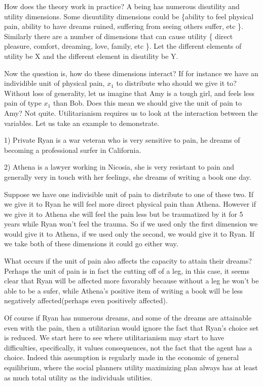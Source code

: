 \documentclass[12pt]{report}
\numberwithin{equation}{section}
\begin{document}
How does the theory work in practice? A being has numerous disutility and utility dimensions. Some disuutility dimensions could be \{ability to feel physical pain, ability to have dreams ruined, suffering from seeing others suffer, etc \}. Similarly there are a number of dimensions that can cause utility \{ direct pleasure, comfort, dreaming, love, family, etc \}. Let the different elements of utility be X and the different element in disutility be Y. 

Now the question is, how do these dimensions interact? If for instance we have an individible unit of physical pain, $x_1$ to distribute who should we give it to? Without loss of generality, let us imagine that Amy is a tough girl, and feels less pain of type $x_1$ than Bob. Does this mean we should give the unit of pain to Amy? Not quite. Utilitarianism requires us to look at the interaction between the variables. Let us take an example to demonstrate. 

1) Private Ryan is a war veteran who is very sensitive to pain, he dreams of becoming a professional surfer in California. 

2) Athena is a lawyer working in Nicosia, she is very resistant to pain and generally very in touch with her feelings, she dreams of writing a book one day.

Suppose we have one indivisible unit of pain to distribute to one of these two. If we give it to Ryan he will feel more direct physical pain than Athena. However if we give it to Athena she will feel the pain less but be traumatized by it for 5 years while Ryan won't feel the trauma. So if we used only the first dimension we would give it to Athena, if we used only the second, we would give it to Ryan. If we take both of these dimensions it could go either way. 

What occurs if the unit of pain also affects the capacity to attain their dreams? Perhaps the unit of pain is in fact the cutting off of a leg, in this case, it seems clear that Ryan will be affected more favorably because without a leg he won't be able to be a sufer, while Athena's positive item of writing a book will be less negatively affected(perhaps even positively affected). 

Of course if Ryan has numerous dreams, and some of the dreams are attainable even with the pain, then a utilitarian would ignore the fact that Ryan's choice set is reduced. We start here to see where utilitarianism may start to have difficulties, specifically, it values consequences, not the fact that the agent has a choice. Indeed this assumption is regularly made in the economic of general equilibrium, where the social planners utility maximizing plan always has at least as much total utility as the individuals utilities. 
\end{document}
